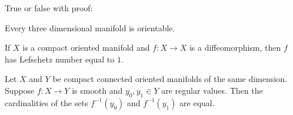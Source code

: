True or false with proof:
\begin{alist}
\item Every three dimensional manifold is orientable.
\item If $X$ is a compact oriented manifold and $f:X\rightarrow X$ is
a diffeomorphism, then $f$ has Lefschetz number equal to $1$.
\item Let $X$ and $Y$ be compact connected oriented manifolds of the
same dimension. Suppose $f:X\rightarrow Y$ is smooth and $y_0,y_1\in
Y$ are regular values. Then the cardinalities of the sets
$f^{-1}(y_0)$ and $f^{-1}(y_1)$ are equal.
\end{alist}
